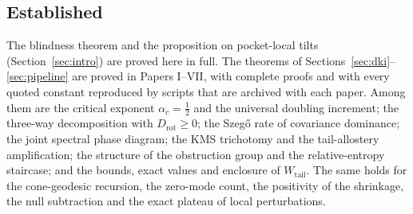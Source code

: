 \documentclass[11pt,reqno]{amsart}
\theoremstyle{plain}
\theoremstyle{definition}
\theoremstyle{remark}
\numberwithin{equation}{section}
\newcommand{\Wtail}{W_{\mathrm{tail}}}
\begin{document}
\subsection*{Established}
The blindness theorem and the proposition on pocket-local tilts (Section~\ref{sec:intro}) are proved here in full. The theorems of Sections~\ref{sec:dki}--\ref{sec:pipeline} are proved in Papers I--VII, with complete proofs and with every quoted constant reproduced by scripts that are archived with each paper. Among them are the critical exponent $\alpha_c=\tfrac12$ and the universal doubling increment; the three-way decomposition with $D_{\mathrm{rot}}\ge0$; the Szeg\H{o} rate of covariance dominance; the joint spectral phase diagram; the KMS trichotomy and the tail-allostery amplification; the structure of the obstruction group and the relative-entropy staircase; and the bounds, exact values and enclosure of $\Wtail$. The same holds for the cone-geodesic recursion, the zero-mode count, the positivity of the shrinkage, the null subtraction and the exact plateau of local perturbations.
\end{document}
